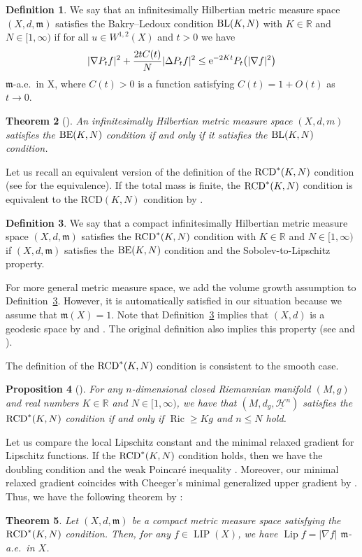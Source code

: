 \documentclass[10pt,a4paper]{amsart}
\numberwithin{equation}{section}
\newtheorem{Thm}{Theorem}[section]
\newtheorem{Prop}[Thm]{Proposition}
\theoremstyle{definition}
\newtheorem{Def}[Thm]{Definition}
\newcommand{\Ric}{\operatorname{Ric}}
\newcommand{\LIP}{\operatorname{LIP}}
\newcommand{\Lip}{\operatorname{Lip}}
\newcommand{\R}{\mathbb{R}}
\newcommand{\mf}{\mathfrak{m}}
\newcommand{\RCD}{{\rm RCD}^\ast}
\newcommand{\BE}{{\rm BE}}
\newcommand{\BL}{{\rm BL}}
\newcommand{\nHa}{\underline{\mathcal{H}}}
\begin{document}
\begin{Def}
We say that an infinitesimally Hilbertian metric measure space $(X,d,\mf)$ satis\-fies the Bakry--Ledoux condition $\BL(K,N)$ with $K\in\R$ and $N\in [1,\infty)$ if for all $u\in W^{1,2}(X)$ and $t>0$ we have
\[
|\nabla P_t f|^2+\frac{2t C(t)}{N}|\Delta P_t f|^2\leq {\rm e}^{-2Kt}P_t\big(|\nabla f|^2\big)
\]
$\mf$-a.e.\ in X, where $C(t)>0$ is a function satisfying $C(t)=1+O(t)$ as $t\to 0$.
\end{Def}
\begin{Thm}[{\cite[Theorem~4.8 and Proposition~4.9]{EKS}}]
An infinitesimally Hilbertian metric measure space $(X,d,m)$ satisfies the $\BE(K,N)$ condition if and only if it satisfies the $\BL(K,N)$ condition.
\end{Thm}
Let us recall an equivalent version of the definition of the $\RCD(K,N)$ condition (see \cite[Theorem~7 and~Definition~3.16]{EKS} for the equivalence).
If the total mass is finite, the $\RCD(K,N)$ condition is equivalent to the $\mathrm{RCD}(K,N)$ condition by \cite[Corollary~13.7]{CM}.

\begin{Def}\label{rcd}
We say that a compact infinitesimally Hilbertian metric measure space $(X,d,\mf)$ satisfies the $\RCD(K,N)$ condition with $K\in\R$ and $N\in [1,\infty)$ if $(X,d,\mf)$ satisfies the $\BE(K,N)$ condition and the Sobolev-to-Lipschitz property.
\end{Def}
For more general metric measure space, we add the volume growth assumption to Definition~\ref{rcd}. However, it is automatically satisfied in our situation because we assume that $\mf(X)=1$.
Note that Definition~\ref{rcd} implies that $(X,d)$ is a geodesic space by \cite[Theorems~3.9 and~3.10]{AGS3} and \cite[Theorem~2.5.23]{BBI}.
The original definition also implies this property (see \cite[Remark 3.8]{EKS} and \cite[Remark~4.6]{Stu1}).

The definition of the $\RCD(K,N)$ condition is consistent to the smooth case.
\begin{Prop}[{\cite[Proposition~4.21]{EKS}}]
For any $n$-dimensional closed Riemannian mani\-fold $(M,g)$ and real numbers $K\in \R$ and $N\in[1,\infty)$, we have that $(M,d_g, \nHa^n)$ satisfies the $\RCD(K,N)$ condition if and only if $\Ric\geq K g $ and $n\leq N$ hold.
\end{Prop}

Let us compare the local Lipschitz constant and the minimal relaxed gradient for Lipschitz functions.
If the $\RCD(K,N)$ condition holds, then we have the doubling condition \cite[Corollary~2.4]{Stu} and the weak Poincar\'{e} inequality \cite[Theorem~1.1]{Raj}.
Moreover, our minimal relaxed gradient coincides with Cheeger's minimal generalized upper gradient \cite[Definition~2.9]{Ch0} by \cite[Theorem~6.2]{AGS1}.
Thus, we have the following theorem by \cite[Theorem~6.1]{Ch0}:
\begin{Thm}
Let $(X,d,\mf)$ be a compact metric measure space satisfying the $\RCD(K,N)$ condition.
Then, for any $f\in \LIP(X)$, we have $\Lip f=|\nabla f|$ $\mf$-a.e.\ in $X$.
\end{Thm}
\end{document}
